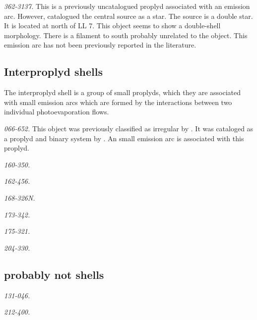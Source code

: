 \documentclass[iop, apj]{emulateapj}
\renewcommand\clearpage{}
\begin{document}
\textit{362-3137.} This is a previously uncatalogued proplyd associated with an emission arc. However, \citet{Da-Rio:2009a} catalogued the central source as a star. The source is a double star. It is located at north of LL 7. This object seems to show a double-shell morphology. There is a filament to south probably unrelated to the object. This emission arc has not been previously reported in the literature. 


\clearpage
\subsection{Interproplyd shells}
\label{sec:interproplyd-group}



The interproplyd shell is a  group of small proplyds, which they are associated with small emission arcs which are formed by the interactions between two individual photoevaporation flows.

\textit{066-652.} This object was previously classified as irregular by \citet{ODell:1996a}. It  was  cataloged as a proplyd and binary system by \citet{Ricci:2008a}. An small emission arc is associated with this proplyd. 
    
\textit{160-350.}

\textit{162-456.}

\textit{168-326N.}

\textit{173-342.}

\textit{175-321.}

\textit{204-330.}

\clearpage
\subsection{probably not shells}
\label{sec:problematic-group}



\label{sec:notshell}

\textit{131-046.} 

\textit{212-400.}


\clearpage
\end{document}

